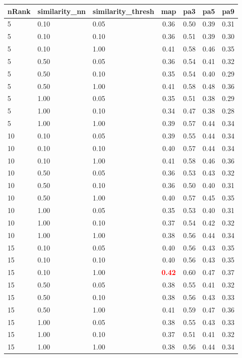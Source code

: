 \begin{tabular}{lllcccc} 
nRank & similarity\_nn & similarity\_thresh & map & pa3 & pa5 & pa9 \\ 
\hline 
 5 & 0.10 & 0.05 & 0.36 & 0.50 & 0.39 & 0.31 \\ 
 5 & 0.10 & 0.10 & 0.36 & 0.51 & 0.39 & 0.30 \\ 
 5 & 0.10 & 1.00 & 0.41 & 0.58 & 0.46 & 0.35 \\ 
 5 & 0.50 & 0.05 & 0.36 & 0.54 & 0.41 & 0.32 \\ 
 5 & 0.50 & 0.10 & 0.35 & 0.54 & 0.40 & 0.29 \\ 
 5 & 0.50 & 1.00 & 0.41 & 0.58 & 0.48 & 0.36 \\ 
 5 & 1.00 & 0.05 & 0.35 & 0.51 & 0.38 & 0.29 \\ 
 5 & 1.00 & 0.10 & 0.34 & 0.47 & 0.38 & 0.28 \\ 
 5 & 1.00 & 1.00 & 0.39 & 0.57 & 0.44 & 0.34 \\ 
10 & 0.10 & 0.05 & 0.39 & 0.55 & 0.44 & 0.34 \\ 
10 & 0.10 & 0.10 & 0.40 & 0.57 & 0.44 & 0.34 \\ 
10 & 0.10 & 1.00 & 0.41 & 0.58 & 0.46 & 0.36 \\ 
10 & 0.50 & 0.05 & 0.36 & 0.53 & 0.43 & 0.32 \\ 
10 & 0.50 & 0.10 & 0.36 & 0.50 & 0.40 & 0.31 \\ 
10 & 0.50 & 1.00 & 0.40 & 0.57 & 0.45 & 0.35 \\ 
10 & 1.00 & 0.05 & 0.35 & 0.53 & 0.40 & 0.31 \\ 
10 & 1.00 & 0.10 & 0.37 & 0.54 & 0.42 & 0.32 \\ 
10 & 1.00 & 1.00 & 0.38 & 0.56 & 0.44 & 0.34 \\ 
15 & 0.10 & 0.05 & 0.40 & 0.56 & 0.43 & 0.35 \\ 
15 & 0.10 & 0.10 & 0.40 & 0.56 & 0.43 & 0.35 \\ 
15 & 0.10 & 1.00 & \textbf{\textcolor{red}{0.42}} & 0.60 & 0.47 & 0.37 \\ 
15 & 0.50 & 0.05 & 0.38 & 0.55 & 0.41 & 0.32 \\ 
15 & 0.50 & 0.10 & 0.38 & 0.56 & 0.43 & 0.33 \\ 
15 & 0.50 & 1.00 & 0.41 & 0.59 & 0.47 & 0.36 \\ 
15 & 1.00 & 0.05 & 0.38 & 0.55 & 0.43 & 0.33 \\ 
15 & 1.00 & 0.10 & 0.37 & 0.51 & 0.41 & 0.32 \\ 
15 & 1.00 & 1.00 & 0.38 & 0.56 & 0.44 & 0.34 \\ 

\end{tabular}
